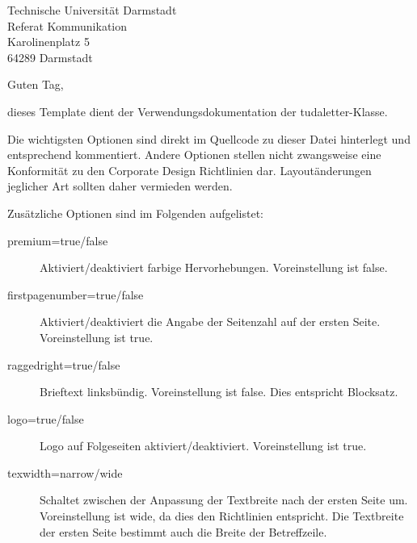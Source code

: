 \documentclass[
	german, %
	accentcolor=9c,%
	premium=true,%
]{tudaletter}
\begin{document}
\begin{letter}{%
    Technische Universität Darmstadt\\
    Referat Kommunikation\\
    Karolinenplatz 5\\
    64289 Darmstadt}


\opening{Guten Tag,}
dieses Template dient der Verwendungsdokumentation der tudaletter-Klasse.

Die wichtigsten Optionen sind direkt im Quellcode zu dieser Datei hinterlegt und entsprechend kommentiert.
Andere Optionen stellen nicht zwangsweise eine Konformität zu den Corporate Design Richtlinien dar.
Layoutänderungen jeglicher Art sollten daher vermieden werden.

Zusätzliche Optionen sind im Folgenden aufgelistet:\\
\parbox{\linewidth}{
	\begin{description}
		\item[premium=true/false] Aktiviert/deaktiviert farbige Hervorhebungen.
		      Voreinstellung ist false.
		\item[firstpagenumber=true/false] Aktiviert/deaktiviert die Angabe der Seitenzahl auf der ersten Seite.
		      Voreinstellung ist true.
		\item[raggedright=true/false] Brieftext linksbündig.
		      Voreinstellung ist false.
		      Dies entspricht Blocksatz.
		\item[logo=true/false] Logo auf Folgeseiten aktiviert/deaktiviert.
		      Voreinstellung ist true.
		\item[texwidth=narrow/wide] Schaltet zwischen der Anpassung der Textbreite nach der ersten Seite um.
		      Voreinstellung ist wide, da dies den Richtlinien entspricht.
		      Die Textbreite der ersten Seite bestimmt auch die Breite der Betreffzeile.
	\end{description}
}


\end{letter}
\end{document}
